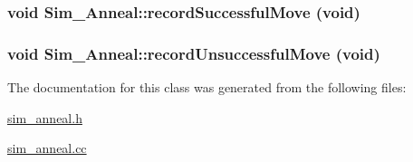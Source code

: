 \hypertarget{classSim__Anneal_e046126356e4cf9719159c66221cb66a}{
\subsubsection[recordSuccessfulMove]{\setlength{\rightskip}{0pt plus 5cm}void Sim\_\-Anneal::recordSuccessfulMove (void)}}
\label{classSim__Anneal_e046126356e4cf9719159c66221cb66a}


\hypertarget{classSim__Anneal_8d31a68b6bf7b2fb8461806503cffbab}{
\subsubsection[recordUnsuccessfulMove]{\setlength{\rightskip}{0pt plus 5cm}void Sim\_\-Anneal::recordUnsuccessfulMove (void)}}
\label{classSim__Anneal_8d31a68b6bf7b2fb8461806503cffbab}




The documentation for this class was generated from the following files:\begin{CompactItemize}
\item 
\hyperlink{sim__anneal_8h}{sim\_\-anneal.h}\item 
\hyperlink{sim__anneal_8cc}{sim\_\-anneal.cc}\end{CompactItemize}
